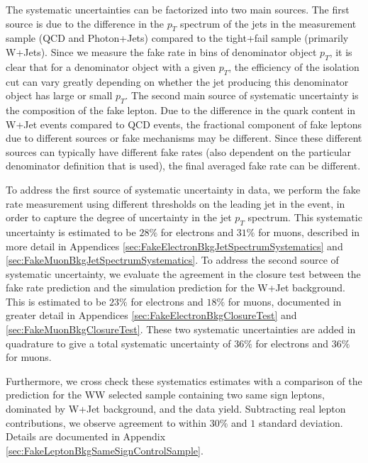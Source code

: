 The systematic uncertainties can be factorized into two main sources. 
The first source is due to the difference in the $p_{T}$ spectrum 
of the jets in the measurement sample (QCD and Photon+Jets) compared
to the tight+fail sample (primarily W+Jets). Since we measure the 
fake rate in bins of denominator object $p_{T}$, it is clear that
for a denominator object with a given $p_{T}$, the efficiency of the
isolation cut can vary greatly depending on whether the jet producing
this denominator object has large or small $p_{T}$. The second main
source of systematic uncertainty is the composition of the fake lepton.
Due to the difference in the quark content in W+Jet events compared
to QCD events, the fractional component of fake leptons due to different 
sources or fake mechanisms may be different. Since these different sources
can typically have different fake rates (also dependent on the particular 
denominator definition that is used), the final averaged fake rate can 
be different.

To address the first source of systematic uncertainty in data, we perform the
fake rate measurement using different thresholds on the leading jet
in the event, in order to capture the degree of uncertainty in 
the jet $p_{T}$ spectrum. This systematic uncertainty is estimated to 
be $28\%$ for electrons and $31\%$ for muons, described in more detail in Appendices 
\ref{sec:FakeElectronBkgJetSpectrumSystematics} and 
\ref{sec:FakeMuonBkgJetSpectrumSystematics}. To address the second 
source of systematic uncertainty, we evaluate the agreement in the closure
test between the fake rate prediction and the simulation prediction for 
the W+Jet background. This is estimated to be $23\%$ for electrons
and $18\%$ for muons, documented in greater 
detail in Appendices \ref{sec:FakeElectronBkgClosureTest} and
\ref{sec:FakeMuonBkgClosureTest}. These two 
systematic uncertainties are added in quadrature to give a total 
systematic uncertainty of $36\%$ for electrons and $36\%$ for muons. 

Furthermore, we cross check these systematics estimates with a comparison of the prediction 
for the WW selected sample containing two same sign leptons, dominated by W+Jet
background, and the data yield. Subtracting real lepton contributions,
we observe agreement to within $30\%$ and $1$ standard deviation. Details
are documented in Appendix \ref{sec:FakeLeptonBkgSameSignControlSample}.



